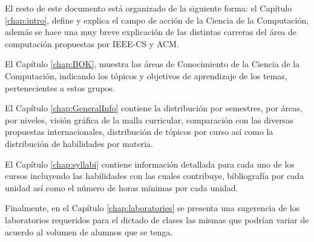 \OtherKeyStones

El resto de este documento está organizado de la siguiente forma: el Capítulo \ref{chap:intro}, 
define y explica el campo de acción de la Ciencia de la Computación, 
además se hace una muy breve explicación de las distintas carreras del área de 
computación propuestas por IEEE-CS y ACM.




El Capítulo \ref{chap:BOK}, muestra las áreas de Conocimiento de la Ciencia de la Computación, 
indicando los tópicos y objetivos de aprendizaje de los temas, pertenecientes a estos grupos.

El Capítulo \ref{chap:GeneralInfo} contiene la distribución por semestres, por áreas, por niveles, 
visión gráfica de la malla curricular, comparación con las diversas propuestas internacionales, 
distribución de tópicos por curso así como la distribución de habilidades por materia.

El Capítulo \ref{chap:syllabi} contiene información detallada para cada uno de los cursos 
incluyendo las habilidades con las cuales contribuye, bibliografía por cada unidad así 
como el número de horas mínimas por cada unidad.


Finalmente, en el Capítulo \ref{chap:laboratories} se presenta una sugerencia de los laboratorios 
requeridos para el dictado de clases las mismas que podrían variar de acuerdo al volumen de alumnos que se tenga.

\newpage
